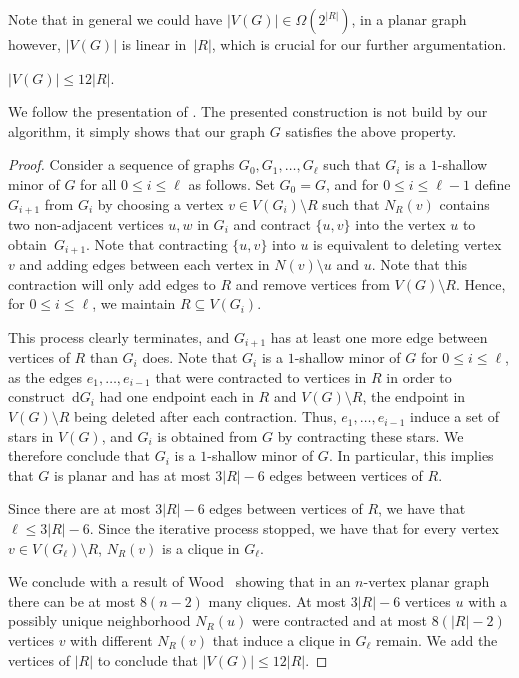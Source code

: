 Note that in general we could have $|V(G)|\in \Omega(2^{|R|})$,
in a planar graph however, $|V(G)|$ is linear in~$|R|$, which is
crucial for our further argumentation.

\begin{lemma}\label{lem:smallX}
  $|V(G)|\le 12|R|$.
\end{lemma}
We follow the presentation of \cite[Lemma~4.3]{gajarsky2017kernelization}.
The presented construction is not build by our algorithm, it simply shows that
our graph $G$ satisfies the above property.
\begin{proof}
  Consider a sequence of graphs $G_0, G_1, \ldots, G_\ell$ such that
  $G_i$ is a $1$-shallow minor of $G$ for all $0 \le i \le \ell$ as follows.
  Set $G_0 = G$, and for $0 \le i\le\ell-1$ define $G_{i+1}$ from $G_i$ by
  choosing a vertex $v\in V (G_i ) \setminus R$ such that $N_R(v)$
  contains two non-adjacent vertices $u, w$ in $G_i$ and contract $\{u,v\}$ into
  the vertex $u$ to obtain~$G_{i+1}$.
  Note that contracting $\{u,v\}$ into $u$ is equivalent to deleting vertex $v$ and
  adding edges between each vertex in $N(v) \setminus u$ and $u$. Note that this
  contraction will only add edges to $R$ and remove vertices from $V(G)\setminus R$.
  Hence, for $0\le i\le\ell$, we maintain $R \subseteq V(G_i)$.

  This process clearly terminates, and $G_{i+1}$ has at least one more edge
  between vertices of $R$ than $G_i$ does. Note that $G_i$ is a $1$-shallow minor
  of $G$ for $0 \le i \le \ell$, as the edges $e_1, \ldots, e_{i-1}$ that were
  contracted to vertices in $R$ in order to construct~d$G_i$ had one endpoint
  each in $R$ and $V(G)\setminus R$, the endpoint in $V(G)\setminus R$
  being deleted after each contraction.
  Thus, $e_1, \ldots, e_{i-1}$ induce a set of stars in $V(G)$, and $G_i$ is
  obtained from $G$ by contracting these stars. We therefore conclude that
  $G_i$ is a $1$-shallow minor of $G$. In particular, this implies that
  $G$ is planar and has at most $3|R|-6$ edges between vertices of $R$.

  Since there are at most $3|R|-6$ edges between vertices of $R$, we have that
  $\ell \le 3|R|-6$.
  Since the iterative process stopped, we have that
  for every vertex $v\in V(G_\ell)\setminus R$, $N_R(v)$ is a clique in $G_\ell$.

  We conclude with a result of Wood~\cite[Corollary~2]{wood2007maximum}
  showing that in an $n$-vertex planar graph there can be at most $8(n-2)$
  many cliques. At most $3|R|-6$ vertices $u$ with a possibly unique
  neighborhood $N_R(u)$ were contracted and at most $8(|R|-2)$
  vertices $v$ with different $N_R(v)$ that induce a clique in $G_\ell$ remain.
  We add the vertices of $|R|$ to conclude that $|V(G)|\leq 12|R|$.
\end{proof}

